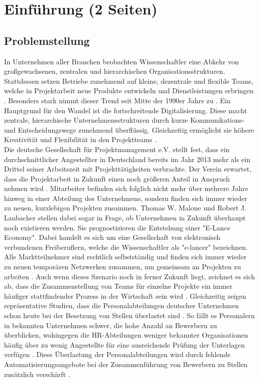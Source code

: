 \chapter{Einführung (2 Seiten)}
\label{ch:intro}

\section{Problemstellung}
\label{sec:intro:motivation}
In Unternehmen aller Branchen beobachten Wissenschaftler eine Abkehr von großgewachsenen, zentralen und hierarchischen Organisationsstrukturen. Stattdessen setzen Betriebe zunehmend auf kleine, dezentrale und flexible Teams, welche in Projektarbeit neue Produkte entwickeln und Dienstleistungen erbringen \cite[S. 15]{elanceEconomy:1999}\cite[S. 8]{whittington:1999}. Besonders stark nimmt dieser Trend seit Mitte der 1990er Jahre zu \cite[S. 8]{whittington:1999}. Ein Hauptgrund für den Wandel ist die fortschreitende Digitalisierung. Diese macht zentrale, hierarchische Unternehmensstrukturen durch kurze Kommunikations- und Entscheidungswege zunehmend überflüssig. Gleichzeitig ermöglicht sie höhere Kreativität und Flexibilität in den Projektteams \cite[S. 17]{elanceEconomy:1999}.\\
Die deutsche Gesellschaft für Projektmanagement e.V. stellt fest, dass ein durchschnittlicher Angestellter in Deutschland bereits im Jahr 2013 mehr als ein Drittel seiner Arbeitszeit mit Projekttätigkeiten verbrachte. Der Verein erwartet, dass die Projektarbeit in Zukunft einen noch größeren Anteil in Anspruch nehmen wird \cite[S. 16]{gpm:2015}. Mitarbeiter befinden sich folglich nicht mehr über mehrere Jahre hinweg in einer Abteilung des Unternehmens, sondern finden sich immer wieder zu neuen, kurzlebigen Projekten zusammen. Thomas W. Malone und Robert J. Laubacher stellen dabei sogar in Frage, ob Unternehmen in Zukunft überhaupt noch existieren werden. Sie prognostizieren die Entstehung einer "E-Lance Economy". Dabei handelt es sich um eine Gesellschaft von elektronisch verbundenen Freiberuflern, welche die Wissenschaftler als "e-lancer" bezeichnen. Alle Marktteilnehmer sind  rechtlich selbstständig und finden sich immer wieder zu neuen temporären Netzwerken zusammen, um gemeinsam an Projekten zu arbeiten \cite[S. 14]{elanceEconomy:1999}. Auch wenn dieses Szenario noch in ferner Zukunft liegt, zeichnet es sich ab, dass die Zusammenstellung von Teams für einzelne Projekte ein immer häufiger stattfindender Prozess in der Wirtschaft sein wird \cite[S. 2]{malinowski:2008}. Gleichzeitig zeigen repräsentative Studien, dass die Personalabteilungen deutscher Unternehmen schon heute bei der Besetzung von Stellen überlastet sind \cite[S. 244]{personalbeschaffung:2017}. So fällt es Personalern in bekannten Unternehmen schwer, die hohe Anzahl an Bewerbern zu überblicken, wohingegen die HR-Abteilungen weniger bekannter Organisationen häufig über zu wenig Angestellte für eine ausreichende Prüfung der Unterlagen verfügen \cite[S. 8]{hays:2013}. Diese Überlastung der Personalabteilungen wird durch fehlende Automatisierungsangebote bei der Zusammenführung von Bewerbern zu Stellen zusätzlich verschärft \cite[S. 15]{hays:2013}.



